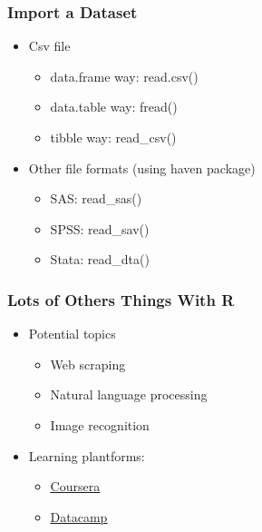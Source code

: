 \documentclass[aspectratio=169, 12pt]{beamer}
\begin{document}
	\begin{frame}
	\frametitle{Import a Dataset}
	\begin{itemize}
	\item Csv file
	\begin{itemize}
	\item data.frame way: read.csv()
	\item data.table way: fread()
	\item tibble way: read\_csv()
	\end{itemize}
	\item Other file formats (using haven package)
	\begin{itemize}
	\item SAS: read\_sas()
	\item SPSS: read\_sav()
	\item Stata: read\_dta()
	\end{itemize}

	\end{itemize}

	\end{frame}

	\begin{frame}
	\frametitle{Lots of Others Things With R}
	\begin{itemize}
	\item Potential topics
	\begin{itemize}
	\item Web scraping
	\item Natural language processing
	\item Image recognition
	\end{itemize}
	\item Learning plantforms:
	\begin{itemize}
	\item \href{https://www.coursera.org/}{\underline{Coursera}}
	\item \href{https://www.datacamp.com/onboarding}{\underline{Datacamp}}
	\end{itemize}

	\end{itemize}

	\end{frame}
\end{document}
